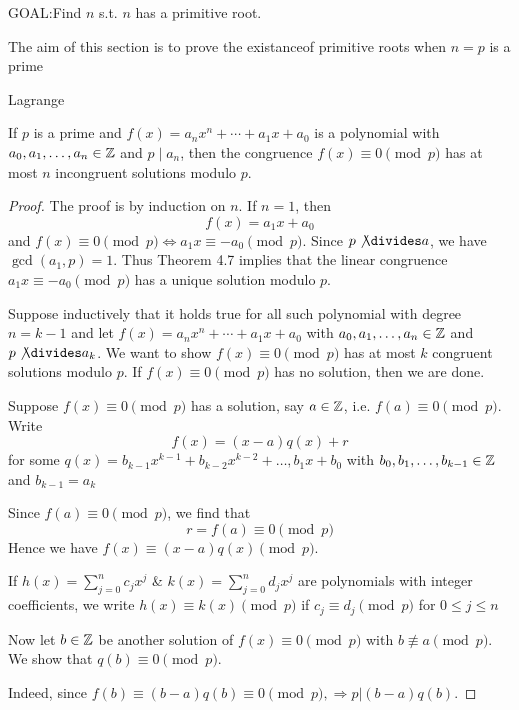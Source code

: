 GOAL:\@ Find $n$ s.t. $n$ has a primitive root.

The aim of this section is to prove the existanceof primitive roots 
when $n = p$ is a prime

\begin{theorem}
    Lagrange

    If $p$ is a prime and $f(x) = a_n x^n + \cdots + a_1x + a_0$
    is a polynomial with $a_0, a_1, \dots, a_n \in \mathbb{Z}$ and $p\;|\;a_n$, 
    then the congruence $f(x) \equiv 0 \pmod p$ has at most $n$ incongruent 
    solutions modulo $p$.
\end{theorem}
\begin{proof}
    The proof is by induction on $n$. If $n = 1$, then 
    \[
        f(x) = a_1 x + a_0
    \]
    and $f(x) \equiv 0 \pmod p \iff a_1 x \equiv -a_0 \pmod p$.
    Since $\displaystyle p \not \divides  a$, we have $\gcd(a_1, p) = 1$. Thus
    Theorem 4.7 implies that the linear congruence $a_1 x\equiv -a_0 \pmod p$
    has a unique solution modulo $p$.

    Suppose inductively that it holds true for all such polynomial with degree $n = k-1$
    and let $f(x) = a_n x^n + \cdots + a_1x + a_0$ with $a_0, a_1, \dots, a_n \in \mathbb{Z}$ and
    $p \not \divides  a_k$. We want to show $f(x) \equiv 0 \pmod p$ has at most $k$ congruent solutions
    modulo $p$.
    If $f(x) \equiv 0 \pmod p$ has no solution, then we are done.

    Suppose $f(x) \equiv 0 \pmod p$ has a solution, say $a \in \mathbb{Z}$, i.e. $f(a) \equiv 0 \pmod p$.
    Write
    \[
        f(x) = (x-a)q(x) + r
    \]
    for some $q(x) = b_{k-1} x^{k-1} + b_{k-2} x^{k-2} + \dots, b_1 x + b_0$
    with $b_0, b_1, \dots, b_{k-1} \in \mathbb{Z}$ and $b_{k-1} = a_k$

    Since $f(a) \equiv 0 \pmod p$, we find that 
    \[  
        r = f(a) \equiv 0 \pmod p
    \]
    Hence we have $f(x) \equiv (x-a)q(x) \pmod p$.

    If $h(x) = \sum_{j=0}^{n}{c_j x^j}$ \& $k(x) = \sum_{j=0}^{n}{d_j x^j}$
    are polynomials with integer coefficients, we write $h(x) \equiv k(x) \pmod p$
    if $c_j \equiv d_j \pmod p$ for $0 \leq j \leq n$

    Now let $b \in \mathbb{Z}$ be another solution of $f(x) \equiv 0 \pmod p$ with 
    $b \not\equiv a \pmod p$. We show that $q(b) \equiv 0 \pmod p$.

    Indeed, since $f(b) \equiv (b - a)q(b) \equiv 0 \pmod p, \Rightarrow p| (b-a)q(b)$.


\end{proof}
